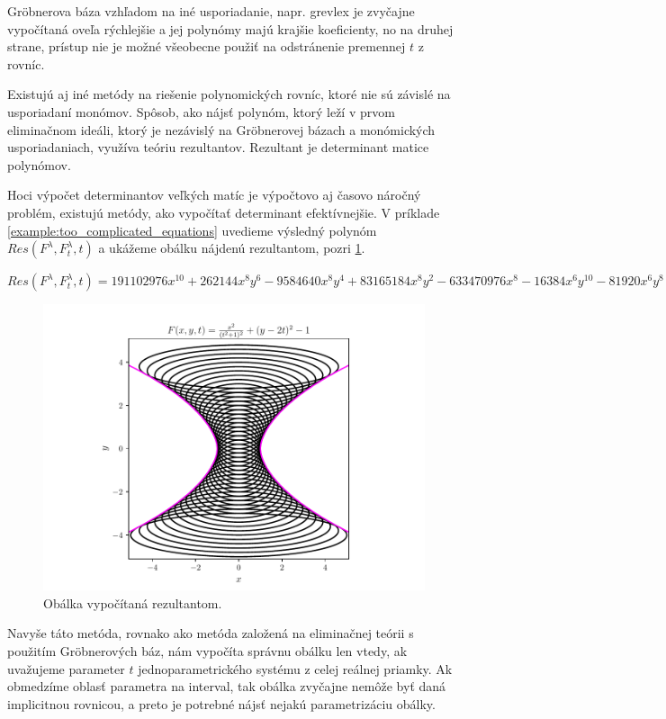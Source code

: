 Gröbnerova báza vzhľadom na iné usporiadanie, napr. grevlex je zvyčajne vypočítaná oveľa rýchlejšie a jej polynómy majú krajšie koeficienty, no na druhej strane, prístup nie je možné všeobecne použiť na odstránenie premennej $t$ z rovníc. 

Existujú aj iné metódy na riešenie polynomických rovníc, ktoré nie sú závislé na usporiadaní monómov. 
Spôsob, ako nájsť polynóm, ktorý leží v prvom eliminačnom ideáli, ktorý je nezávislý na Gröbnerovej bázach a monómických usporiadaniach, využíva teóriu rezultantov. Rezultant je determinant matice polynómov.

Hoci výpočet determinantov veľkých matíc je výpočtovo aj časovo náročný problém, existujú metódy, ako  vypočítať determinant efektívnejšie. V príklade \ref{example:too_complicated_equations} uvedieme výsledný polynóm $Res(F^\lambda , F_t^\lambda , t)$ a ukážeme obálku nájdenú rezultantom, pozri \ref{fig:resultant}. 

$ Res(F^\lambda , F_t^\lambda , t) = 191102976x^{10} + 262144x^8y^6 - 9584640x^8y^4 + 83165184x^8y^2 - 633470976x^8 - 16384x^6y^{10} - 81920x^6y^8 - 14483456x^6y^6 - 113311744x^6y^4 + 96419840x^6y^2 + 698368000x^6 - 16384x^4y^{12} - 294912x^4y^{10} - 2998272x^4y^8 - 18284544x^4y^6 - 74956800x^4y^4 - 184320000x^4y^2 - 256000000x^4. $

\begin{figure}[H]
	\centering
	\includegraphics{images/resultant.pdf}
	\caption{Obálka vypočítaná rezultantom.}
	\label{fig:resultant}
\end{figure}

Navyše táto metóda, rovnako ako metóda založená na eliminačnej teórii s použitím Gröbnerových báz, nám vypočíta správnu obálku len vtedy, ak uvažujeme parameter $t$ jednoparametrického systému z celej reálnej priamky. Ak obmedzíme oblasť parametra na interval, tak obálka zvyčajne nemôže byť daná implicitnou rovnicou, a preto je potrebné nájsť nejakú parametrizáciu obálky. 

